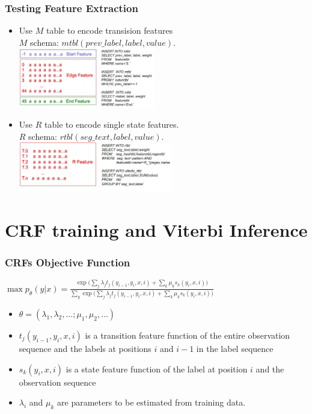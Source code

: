 \documentclass{beamer}
\begin{document}
\begin{frame}
  \frametitle{Testing Feature Extraction}
  \begin{itemize}
  \item Use $M$ table to encode transision features \\
  $M$ schema: $mtbl(prev\_label,label,value)$.
  \includegraphics[height=7.02em]{m.png}\\
  \item Use $R$ table to encode single state features.\\ 
  $R$ schema: $rtbl(seg\_text,label,value)$. \\
  \includegraphics[height=5.85em]{r.png}\\
  \end{itemize}
\end{frame}

\section{CRF training and Viterbi Inference}
\begin{frame}
  \frametitle{CRFs Objective Function}
  $\max p_\theta (y|x) = \frac{\exp(\sum_j{\lambda_jt_j(y_{i-1},y_i,x,i) + \sum_k{\mu_k s_k(y_i,x,i))}}}
                        {\sum_y {\exp(\sum_j{\lambda_jt_j(y_{i-1},y_i,x,i) + \sum_k{\mu_k s_k(y_i,x,i))}}}}$\\
  \begin{itemize}
  \item $\theta=(\lambda_1,\lambda_2,...;\mu_1,\mu_2,...)$
  \item $t_j(y_{i-1},y_i,x,i)$ is a transition feature function of the entire observation sequence and the labels at positions $i$ and 
       $i-1$ in the label sequence
  \item $s_k(y_i,x,i)$ is a state feature function of the label at position $i$ and the observation sequence
  \item $\lambda_i$ and $\mu_k$ are parameters to be estimated from training data.
  \end{itemize}
\end{frame}
\end{document}
